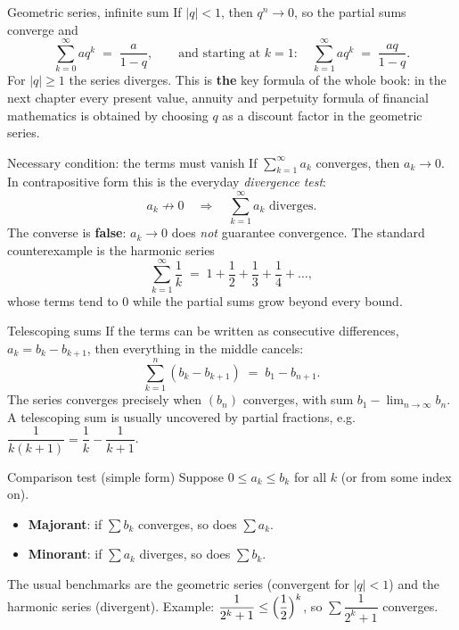 \begin{rulebox}{Geometric series, infinite sum}
If $|q|<1$, then $q^{n}\to 0$, so the partial sums converge and
\[
  \sum_{k=0}^{\infty} a q^{k} \;=\; \frac{a}{1-q},
  \qquad\text{and starting at } k=1:\quad
  \sum_{k=1}^{\infty} a q^{k} \;=\; \frac{aq}{1-q} .
\]
For $|q|\ge 1$ the series diverges. This is \textbf{the} key formula of the
whole book: in the next chapter every present value, annuity and perpetuity
formula of financial mathematics is obtained by choosing $q$ as a discount
factor in the geometric series.
\end{rulebox}

\begin{rulebox}{Necessary condition: the terms must vanish}
If $\sum_{k=1}^{\infty} a_k$ converges, then $a_k\to 0$. In contrapositive
form this is the everyday \emph{divergence test}:
\[
  a_k \not\to 0 \quad\Longrightarrow\quad \sum_{k=1}^{\infty} a_k
  \text{ diverges.}
\]
The converse is \textbf{false}: $a_k\to 0$ does \emph{not} guarantee
convergence. The standard counterexample is the harmonic series
\[
  \sum_{k=1}^{\infty}\frac{1}{k} \;=\; 1+\frac12+\frac13+\frac14+\dots,
\]
whose terms tend to $0$ while the partial sums grow beyond every bound.
\end{rulebox}

\begin{rulebox}{Telescoping sums}
If the terms can be written as consecutive differences, $a_k=b_k-b_{k+1}$,
then everything in the middle cancels:
\[
  \sum_{k=1}^{n}(b_k-b_{k+1}) \;=\; b_1-b_{n+1} .
\]
The series converges precisely when $(b_n)$ converges, with sum
$b_1-\lim_{n\to\infty} b_n$. A telescoping sum is
usually uncovered by partial fractions, e.g.
$\dfrac{1}{k(k+1)}=\dfrac{1}{k}-\dfrac{1}{k+1}$.
\end{rulebox}

\begin{rulebox}{Comparison test (simple form)}
Suppose $0\le a_k\le b_k$ for all $k$ (or from some index on).
\begin{itemize}[leftmargin=1.6em,itemsep=0.3ex]
  \item \textbf{Majorant}: if
        $\sum b_k$ converges, so does $\sum a_k$.
  \item \textbf{Minorant}: if
        $\sum a_k$ diverges, so does $\sum b_k$.
\end{itemize}
The usual benchmarks are the geometric series (convergent for $|q|<1$) and
the harmonic series (divergent). Example:
$\dfrac{1}{2^{k}+1}\le\Bigl(\dfrac12\Bigr)^{k}$, so
$\sum\dfrac{1}{2^{k}+1}$ converges.
\end{rulebox}

